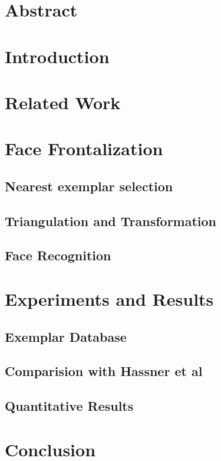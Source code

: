 \section{Abstract}

\section{Introduction}

\section{Related Work}

\section{Face Frontalization}

\subsection{Nearest exemplar selection}

\subsection{Triangulation and Transformation}

\subsection{Face Recognition}

\section{Experiments and Results}

\subsection{Exemplar Database}

\subsection{Comparision with Hassner et al}

\subsection{Quantitative Results}

\section{Conclusion}